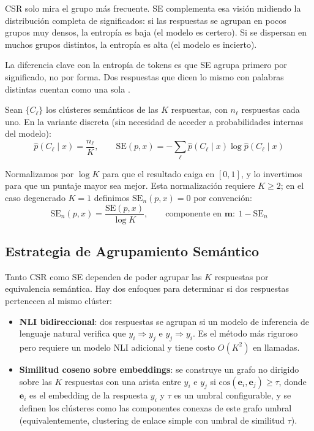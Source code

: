 \documentclass[11pt,a4paper]{article}
\begin{document}
CSR solo mira el grupo más frecuente. SE complementa esa visión midiendo la distribución completa de significados: si las respuestas se agrupan en pocos grupos muy densos, la entropía es baja (el modelo es certero). Si se dispersan en muchos grupos distintos, la entropía es alta (el modelo es incierto).

La diferencia clave con la entropía de tokens es que SE agrupa primero por significado, no por forma. Dos respuestas que dicen lo mismo con palabras distintas cuentan como una sola \citep{semanticentropy2024}.

Sean $\{C_\ell\}$ los clústeres semánticos de las $K$ respuestas, con $n_\ell$ respuestas cada uno. En la variante discreta (sin necesidad de acceder a probabilidades internas del modelo):
\[
\hat{p}(C_\ell \mid x) = \frac{n_\ell}{K}, \qquad
\mathrm{SE}(p, x) = -\sum_{\ell} \hat{p}(C_\ell \mid x) \log \hat{p}(C_\ell \mid x)
\]

Normalizamos por $\log K$ para que el resultado caiga en $[0, 1]$, y lo invertimos para que un puntaje mayor sea mejor. Esta normalización requiere $K \geq 2$; en el caso degenerado $K = 1$ definimos $\mathrm{SE}_n(p, x) = 0$ por convención:
\[
\mathrm{SE}_n(p, x) = \frac{\mathrm{SE}(p, x)}{\log K}, \qquad \text{componente en } \mathbf{m}: \ 1 - \mathrm{SE}_n
\]

\subsection{Estrategia de Agrupamiento Semántico}
\label{sec:clustering}

Tanto CSR como SE dependen de poder agrupar las $K$ respuestas por equivalencia semántica. Hay dos enfoques para determinar si dos respuestas pertenecen al mismo clúster:

\begin{itemize}[noitemsep]
    \item \textbf{NLI bidireccional}: dos respuestas se agrupan si un modelo de inferencia de lenguaje natural verifica que $y_i \Rightarrow y_j$ e $y_j \Rightarrow y_i$. Es el método más riguroso pero requiere un modelo NLI adicional y tiene costo $O(K^2)$ en llamadas.
    \item \textbf{Similitud coseno sobre embeddings}: se construye un grafo no dirigido sobre las $K$ respuestas con una arista entre $y_i$ e $y_j$ si $\mathrm{cos}(\mathbf{e}_i, \mathbf{e}_j) \geq \tau$, donde $\mathbf{e}_i$ es el embedding de la respuesta $y_i$ y $\tau$ es un umbral configurable, y se definen los clústeres como las componentes conexas de este grafo umbral (equivalentemente, clustering de enlace simple con umbral de similitud $\tau$).
\end{itemize}
\end{document}
